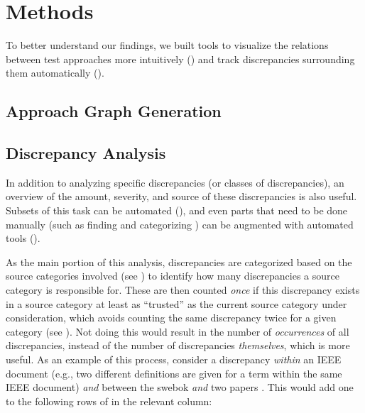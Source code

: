 \section{Methods}
\label{methods}

\newcommand{\autoDiscreps}[1][,]{discrepancies in \Cref{syns,par-rels},
    including \refDiscrepsTable{}#1}

To better understand our findings, we built tools to visualize the
relations between test approaches more intuitively () and track
discrepancies surrounding them automatically ().

\subsection{Approach Graph Generation}
\label{graph-gen}

\graphGenDesc{}

\subsection{Discrepancy Analysis}
\label{discrep-analysis}

In addition to analyzing specific discrepancies (or classes of discrepancies),
an overview of the amount, severity, and source of these discrepancies is also
useful. Subsets of this task can be automated (),
and even parts that need to be done manually (such as finding and categorizing
) can be augmented with automated
tools ().

As the main portion of this analysis, discrepancies are categorized
based on the source categories involved (see ) to identify how
many discrepancies a source category is responsible for. These
are then counted \emph{once} if this discrepancy exists in a source category at
least as ``trusted'' as the current source category under consideration, which
avoids counting the same discrepancy twice for a given category (see
). Not doing this would result in the number of
\emph{occurrences} of all discrepancies, instead of the number of discrepancies
\emph{themselves}, which is more useful.
As an example of this process, consider a discrepancy \emph{within} an IEEE
document (e.g., two different definitions are given for a term within the same
IEEE document) \emph{and} between the \acs{swebok} \emph{and} two papers%
. This would add one to the following rows of
 in the relevant column:

